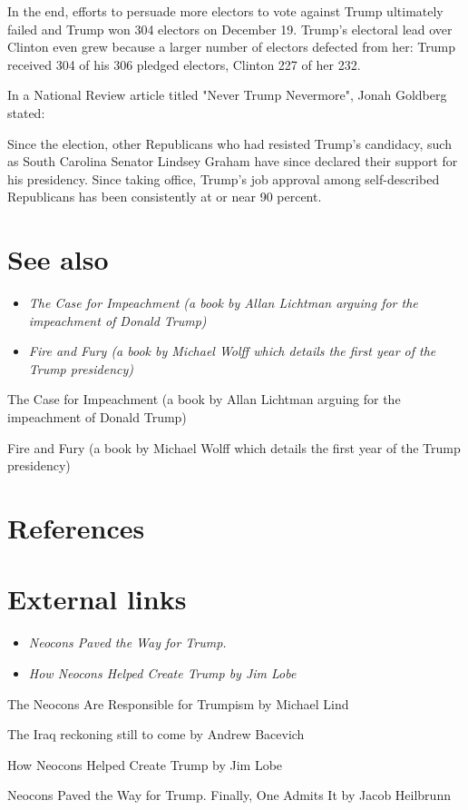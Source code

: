 In the end, efforts to persuade more electors to vote against Trump
ultimately failed and Trump won 304 electors on December 19. Trump's
electoral lead over Clinton even grew because a larger number of
electors defected from her: Trump received 304 of his 306 pledged
electors, Clinton 227 of her 232.

In a National Review article titled "Never Trump Nevermore", Jonah
Goldberg stated:

Since the election, other Republicans who had resisted Trump's
candidacy, such as South Carolina Senator Lindsey Graham have since
declared their support for his presidency. Since taking office, Trump's
job approval among self-described Republicans has been consistently at
or near 90 percent.

\section{See also}\label{see-also}

\begin{itemize}
\item
  \emph{The Case for Impeachment (a book by Allan Lichtman arguing for
  the impeachment of Donald Trump)}
\item
  \emph{Fire and Fury (a book by Michael Wolff which details the first
  year of the Trump presidency)}
\end{itemize}

The Case for Impeachment (a book by Allan Lichtman arguing for the
impeachment of Donald Trump)

Fire and Fury (a book by Michael Wolff which details the first year of
the Trump presidency)

\section{References}\label{references}

\section{External links}\label{external-links}

\begin{itemize}
\item
  \emph{Neocons Paved the Way for Trump.}
\item
  \emph{How Neocons Helped Create Trump by Jim Lobe}
\end{itemize}

The Neocons Are Responsible for Trumpism by Michael Lind

The Iraq reckoning still to come by Andrew Bacevich

How Neocons Helped Create Trump by Jim Lobe

Neocons Paved the Way for Trump. Finally, One Admits It by Jacob
Heilbrunn
